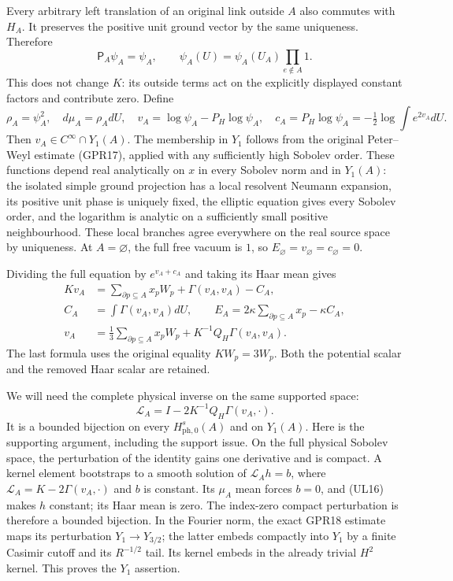 \documentclass[11pt]{article}
\begin{document}
Every arbitrary left translation of an original link outside \(A\) also commutes with \(H_A\). It preserves the positive unit ground vector by the same uniqueness. Therefore
\[
 \mathsf P_A\psi_A=\psi_A,\qquad
 \psi_A(U)=\psi_A(U_A)\prod_{e\notin A}1.
 \tag{UL17}
\]
This does not change \(K\): its outside terms act on the explicitly displayed constant factors and contribute zero. Define
\[
 \rho_A=\psi_A^2,\quad d\mu_A=\rho_AdU,\quad
 v_A=\log\psi_A-P_H\log\psi_A,\quad
 c_A=P_H\log\psi_A=-\tfrac12\log\int e^{2v_A}dU.
 \tag{UL18}
\]
Then \(v_A\in C^\infty\cap Y_1(A)\). The membership in \(Y_1\) follows from the original Peter–Weyl estimate (GPR17), applied with any sufficiently high Sobolev order. These functions depend real analytically on \(x\) in every Sobolev norm and in \(Y_1(A)\): the isolated simple ground projection has a local resolvent Neumann expansion, its positive unit phase is uniquely fixed, the elliptic equation gives every Sobolev order, and the logarithm is analytic on a sufficiently small positive neighbourhood. These local branches agree everywhere on the real source space by uniqueness. At \(A=\varnothing\), the full free vacuum is \(1\), so \(E_\varnothing=v_\varnothing=c_\varnothing=0\).

Dividing the full equation by \(e^{v_A+c_A}\) and taking its Haar mean gives
\[
\begin{aligned}
 Kv_A&=\sum_{\partial p\subseteq A}x_pW_p
        +\Gamma(v_A,v_A)-C_A,\\
 C_A&=\int\Gamma(v_A,v_A)dU,\qquad
 E_A=2\kappa\sum_{\partial p\subseteq A}x_p-\kappa C_A,\\
 v_A&=\tfrac13\sum_{\partial p\subseteq A}x_pW_p
             +K^{-1}Q_H\Gamma(v_A,v_A).
\end{aligned}\tag{UL19}
\]
The last formula uses the original equality \(KW_p=3W_p\). Both the potential scalar and the removed Haar scalar are retained.

We will need the complete physical inverse on the same supported space:
\[
 \mathscr L_A=I-2K^{-1}Q_H\Gamma(v_A,\cdot).
 \tag{UL20}
\]
It is a bounded bijection on every \(H^s_{\mathrm{ph},0}(A)\) and on \(Y_1(A)\). Here is the supporting argument, including the support issue. On the full physical Sobolev space, the perturbation of the identity gains one derivative and is compact. A kernel element bootstraps to a smooth solution of
\(\mathcal L_Ah=b\), where \(\mathcal L_A=K-2\Gamma(v_A,\cdot)\) and \(b\) is constant. Its \(\mu_A\) mean forces \(b=0\), and (UL16) makes \(h\) constant; its Haar mean is zero. The index-zero compact perturbation is therefore a bounded bijection. In the Fourier norm, the exact GPR18 estimate maps its perturbation \(Y_1\to Y_{3/2}\); the latter embeds compactly into \(Y_1\) by a finite Casimir cutoff and its \(R^{-1/2}\) tail. Its kernel embeds in the already trivial \(H^2\) kernel. This proves the \(Y_1\) assertion.
\end{document}
